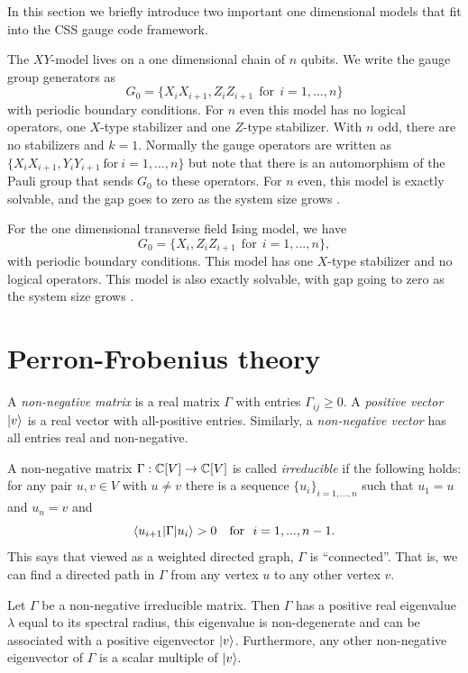 In this section we briefly introduce two important
one dimensional models that fit into the CSS gauge code framework.

The $XY$-model \cite{Pfeuty1970}
lives on a one dimensional chain of $n$ qubits.
We write the gauge group generators as
$$
    G_0 = \{ X_i X_{i+1}, Z_i Z_{i+1}\ \ \mbox{for}\ \ i=1,...,n \}
$$
with periodic boundary conditions.
For $n$ even this model has no logical operators, one 
$X$-type stabilizer and one $Z$-type stabilizer.
With $n$ odd, there are no stabilizers and $k=1.$
Normally the gauge operators are written as 
$\{ X_i X_{i+1}, Y_i Y_{i+1} \ \mbox{for}\ i=1,...,n \}$
but note that there is an automorphism of the Pauli group
that sends $G_0$ to these operators.
For $n$ even, this model is exactly solvable,
and the gap goes to zero
as the system size grows \cite{Lieb1961}.

For the one dimensional transverse field
Ising model, we have 
$$
    G_0 = \{ X_i, Z_i Z_{i+1}\ \ \mbox{for}\ \ i=1,...,n \},
$$
with periodic boundary conditions.
This model has one 
$X$-type stabilizer and no logical operators.
This model is also exactly solvable, with gap going to zero
as the system size grows \cite{Pfeuty1970}.

\section{Perron-Frobenius theory}


A \emph{non-negative matrix} is a real matrix
$\Gamma$ with entries $\Gamma_{ij}\ge 0.$
A \emph{positive vector} $|{v}\rangle$ is a real vector 
with all-positive entries. Similarly, a \emph{non-negative vector}
has all entries real and non-negative.

A non-negative matrix 
$\Gamma : \mathbb{C}[V] \to \mathbb{C}[V]$
is called \emph{irreducible} if the following holds:
for any pair $u, v\in V$ with $u\ne v$ there is
a sequence $\{u_i \}_{i=1,...,n}$ such that $u_1=u$
and $u_n=v$ and
$$
    \bra{u_{i+1}}\Gamma\ket{u_i} > 0\ \ \ \mbox{for}\ \ i=1,...,n-1.
$$
This says that viewed as a weighted directed graph, $\Gamma$ is
``connected''.
That is, we can find a directed path in $\Gamma$
from any vertex $u$
to any other vertex $v$.

Let $\Gamma$ be a non-negative irreducible matrix.
Then $\Gamma$ has a positive real eigenvalue
$\lambda$ equal to its spectral radius,
this eigenvalue is non-degenerate and can be associated 
with a positive eigenvector $|{v}\rangle$.
Furthermore, any other non-negative eigenvector of 
$\Gamma$ is a scalar multiple of $|{v}\rangle.$
\tombstone


